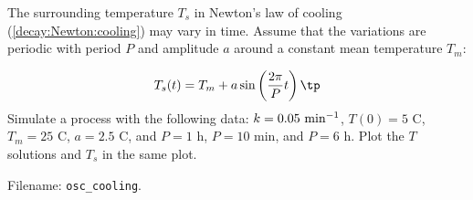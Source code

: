 \documentclass[graybox,sectrefs,envcountresetchap,open=right,final]{svmonodo}
\makeatletter
\newenvironment{doconceexercise}{}{}
\newcounter{doconceexercisecounter}%
\newcommand\listofexercises{
\chapter*{List of Exercises, Problems, and Projects
          \@mkboth{List of Exercises, Problems, and Projects}{List of Exercises, Problems, and Projects}}
\markboth{List of Exercises, Problems, and Projects}{List of Exercises, Problems, and Projects}
\@starttoc{loe}
}
\makeatother
\begin{document}
\begin{doconceexercise}

                
\label{decay:app:exer:cooling:osc}

The surrounding temperature $T_s$ in Newton's law of cooling
(\ref{decay:Newton:cooling}) may vary in time. Assume that the
variations are periodic with period $P$ and amplitude $a$ around
a constant mean temperature $T_m$:

\begin{equation}
T_s(t) = T_m + a\sin\left(\frac{2\pi}{P}t\right)
\tp
\end{equation}
Simulate a process with the following data: $k=0.05 \hbox{ min}^{-1}$,
$T(0)=5$ C, $T_m=25$ C, $a=2.5$ C, and $P=1$ h, $P=10$ min, and $P=6$ h.
Plot the $T$ solutions and $T_s$ in the same plot.

\noindent Filename: \Verb!osc_cooling!.

\end{doconceexercise}
\end{document}
